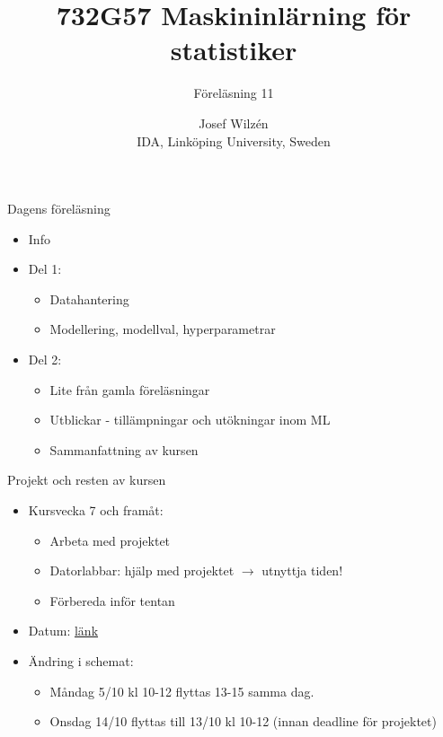 \documentclass[10pt,english]{beamer}
\title{732G57 Maskininlärning för statistiker}
\subtitle{Föreläsning 11}
\date{}
\author{Josef Wilzén \\ IDA, Linköping University, Sweden}
\begin{document}
\maketitle

\begin{frame}{Dagens föreläsning}

    \begin{itemize}
        \item Info
        \item Del 1:
        \begin{itemize}
          \item Datahantering
          \item Modellering, modellval, hyperparametrar  
        \end{itemize}
        \item Del 2:
        \begin{itemize}
          \item Lite från gamla föreläsningar
          \item Utblickar - tillämpningar och utökningar inom ML
          \item Sammanfattning av kursen
        \end{itemize}
    \end{itemize}
    
\end{frame}

\begin{frame}{Projekt och resten av kursen}
    
  \begin{itemize}
        \item Kursvecka 7 och framåt: 
        \begin{itemize}
          \item Arbeta med projektet
          \item Datorlabbar: hjälp med projektet $\rightarrow$ utnyttja tiden!
          \item Förbereda inför tentan
        \end{itemize}
        \item Datum: \href{https://raw.githubusercontent.com/STIMALiU/732G57_ML/refs/heads/main/project/Datum_ht2026.pdf}{länk}
        \item Ändring i schemat: 
        \begin{itemize}
          \item Måndag 5/10 kl 10-12 flyttas 13-15 samma dag.
          \item Onsdag 14/10 flyttas till 13/10 kl 10-12 (innan deadline för projektet)
        \end{itemize}
    \end{itemize}

\end{frame}
\end{document}
